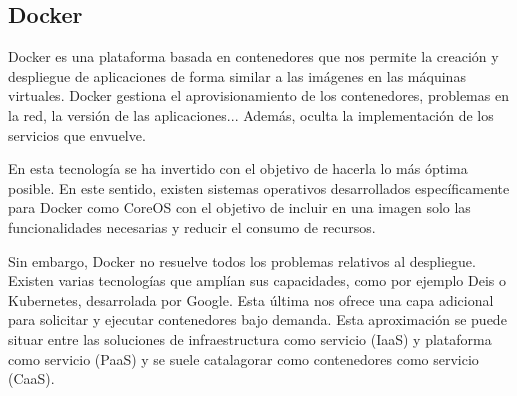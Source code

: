 \documentclass[11pt,a4paper]{article}
\begin{document}
\subsection{Docker}

Docker es una plataforma basada en contenedores que nos permite la creación y despliegue de aplicaciones de forma similar a las imágenes en las máquinas virtuales. Docker gestiona el aprovisionamiento de los contenedores, problemas en la red, la versión de las aplicaciones... Además, oculta la implementación de los servicios que envuelve.

En esta tecnología se ha invertido con el objetivo de hacerla lo más óptima posible. En este sentido, existen sistemas operativos desarrollados específicamente para Docker como CoreOS con el objetivo de incluir en una imagen solo las funcionalidades necesarias y reducir el consumo de recursos.

Sin embargo, Docker no resuelve todos los problemas relativos al despliegue. Existen varias tecnologías que amplían sus capacidades, como por ejemplo Deis o Kubernetes, desarrolada por Google. Esta última nos ofrece una capa adicional para solicitar y ejecutar contenedores bajo demanda. Esta aproximación se puede situar entre las soluciones de infraestructura como servicio (IaaS) y plataforma como servicio (PaaS) y se suele catalagorar como contenedores como servicio (CaaS).
\end{document}

